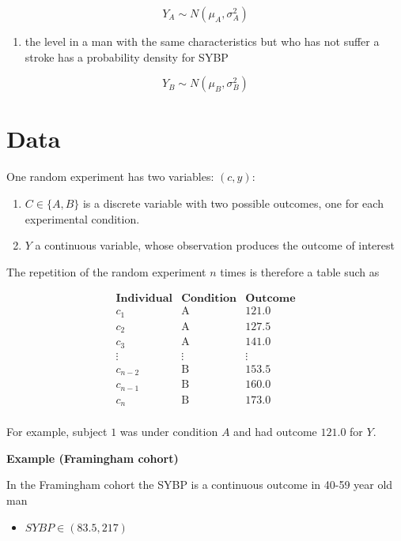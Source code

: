 \documentclass[
]{book}
\providecommand{\tightlist}{%
  \setlength{\itemsep}{0pt}\setlength{\parskip}{0pt}}
\begin{document}
\[Y_A \sim N(\mu_A, \sigma_A^2)\]

\begin{enumerate}
\def\labelenumi{\arabic{enumi})}
\setcounter{enumi}{1}
\tightlist
\item
  the level in a man with the same characteristics but who has not suffer a stroke has a probability density for SYBP
\end{enumerate}

\[Y_B \sim N(\mu_B, \sigma_B^2)\]

\hypertarget{data-1}{%
\section{Data}\label{data-1}}

One random experiment has two variables: \((c, y)\):

\begin{enumerate}
\def\labelenumi{\arabic{enumi}.}
\item
  \(C \in \{A,B\}\) is a discrete variable with two possible outcomes, one for each experimental condition.
\item
  \(Y\) a continuous variable, whose observation produces the outcome of interest
\end{enumerate}

The repetition of the random experiment \(n\) times is therefore a table such as

\[
\begin{array}{ccc}
\mathbf{Individual} & \mathbf{Condition} & \mathbf{Outcome} \\ 
c_1 & \text{A} & \text{121.0} \\ 
c_2 & \text{A} & \text{127.5} \\
c_3 & \text{A} & \text{141.0} \\
\vdots & \vdots & \vdots \\ 
c_{n-2} & \text{B} & \text{153.5} \\ 
c_{n-1} & \text{B} & \text{160.0} \\ 
c_{n}& \text{B} & \text{173.0} \\ 
\end{array}
\]

For example, subject \(1\) was under condition \(A\) and had outcome \(121.0\) for \(Y\).

\textbf{Example (Framingham cohort)}

In the Framingham cohort the SYBP is a continuous outcome in 40-59 year old man

\begin{itemize}
\tightlist
\item
  \(SYBP \in (83.5, 217)\)
\end{itemize}
\end{document}
